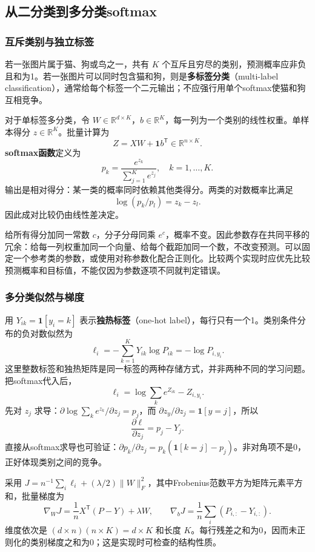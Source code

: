 \documentclass[UTF8,fontset=none,zihao=-4,a4paper]{ctexart}
\newcommand{\term}[1]{\textbf{#1}}
\numberwithin{equation}{section}
\numberwithin{figure}{section}
\begin{document}
\subsection{从二分类到多分类softmax}
\subsubsection{互斥类别与独立标签}
若一张图片属于猫、狗或鸟之一，共有 $K$ 个互斥且穷尽的类别，预测概率应非负且和为1。若一张图片可以同时包含猫和狗，则是\term{多标签分类}（multi-label classification），通常给每个标签一个二元输出；不应强行用单个softmax使猫和狗互相竞争。

对于单标签多分类，令 $W\in\mathbb R^{d\times K}$，$b\in\mathbb R^K$，每一列为一个类别的线性权重。单样本得分 $z\in\mathbb R^K$。批量计算为
\[ Z=XW+\symbf1b^{\mathsf T}\in\mathbb R^{n\times K}. \]
\term{softmax函数}定义为
\begin{equation}
 p_k=\frac{e^{z_k}}{\sum_{j=1}^K e^{z_j}},\quad k=1,\ldots,K.
\end{equation}
输出是相对得分：某一类的概率同时依赖其他类得分。两类的对数概率比满足
\[ \log(p_k/p_l)=z_k-z_l. \]
因此成对比较仍由线性差决定。

给所有得分加同一常数 $c$，分子分母同乘 $e^c$，概率不变。因此参数存在共同平移的冗余：给每一列权重加同一个向量、给每个截距加同一个数，不改变预测。可以固定一个参考类的参数，或使用对称参数化配合正则化。比较两个实现时应优先比较预测概率和目标值，不能仅因为参数逐项不同就判定错误。

\subsubsection{多分类似然与梯度}
用 $Y_{ik}=\mathbf1[y_i=k]$ 表示\term{独热标签}（one-hot label），每行只有一个1。类别条件分布的负对数似然为
\[
 \ell_i=-\sum_{k=1}^K Y_{ik}\log P_{ik}=-\log P_{i,y_i}.
\]
这里整数标签和独热矩阵是同一标签的两种存储方式，并非两种不同的学习问题。把softmax代入后，
\[
 \ell_i=\log\sum_k e^{Z_{ik}}-Z_{i,y_i}.
\]
先对 $z_j$ 求导：$\partial\log\sum_k e^{z_k}/\partial z_j=p_j$，而 $\partial z_y/\partial z_j=\mathbf1[y=j]$，所以
\begin{equation}
 \frac{\partial\ell}{\partial z_j}=p_j-Y_j.
\end{equation}
直接从softmax求导也可验证：$\partial p_k/\partial z_j=p_k(\mathbf1[k=j]-p_j)$。非对角项不是0，正好体现类别之间的竞争。

采用 $J=n^{-1}\sum_i\ell_i+(\lambda/2)\|W\|_F^2$，其中Frobenius范数平方为矩阵元素平方和，批量梯度为
\[
 \nabla_WJ=\frac1nX^{\mathsf T}(P-Y)+\lambda W,\qquad
 \nabla_bJ=\frac1n\sum_i(P_{i,:}-Y_{i,:}).
\]
维度依次是 $(d\times n)(n\times K)=d\times K$ 和长度 $K$。每行残差之和为0，因而未正则化的类别梯度之和为0；这是实现时可检查的结构性质。
\end{document}

